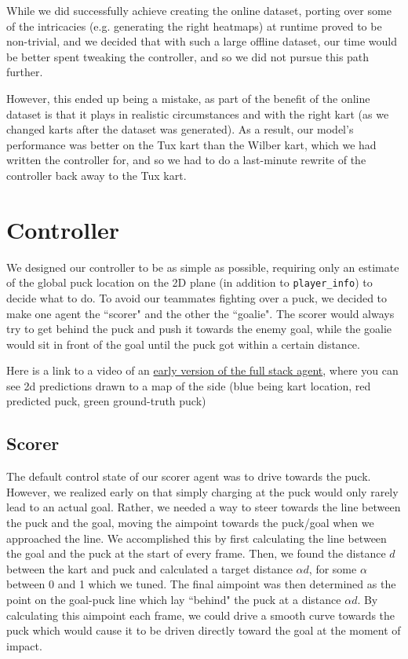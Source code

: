 \documentclass{article}
\begin{document}
While we did successfully achieve creating the online dataset, porting over some of the intricacies (e.g. generating the right heatmaps) at runtime proved to be non-trivial, and we decided that with such a large offline dataset, our time would be better spent tweaking the controller, and so we did not pursue this path further.

However, this ended up being a mistake, as part of the benefit of the online dataset is that it plays in realistic circumstances and with the right kart (as we changed karts after the dataset was generated). As a result, our model's performance was better on the Tux kart than the Wilber kart, which we had written the controller for, and so we had to do a last-minute rewrite of the controller back away to the Tux kart.

\section{Controller}
We designed our controller to be as simple as possible, requiring only an estimate of the global puck location on the 2D plane (in addition to \texttt{player\_info}) to decide what to do. To avoid our teammates fighting over a puck, we decided to make one agent the ``scorer" and the other the ``goalie". The scorer would always try to get behind the puck and push it towards the enemy goal, while the goalie would sit in front of the goal until the puck got within a certain distance.

Here is a link to a video of an \textcolor{blue}{\href{https://youtu.be/Y8gm358y8js}{early version of the full stack agent}}, where you can see 2d predictions drawn to a map of the side (blue being kart location, red predicted puck, green ground-truth puck)

\subsection{Scorer}
The default control state of our scorer agent was to drive towards the puck. However, we realized early on that simply charging at the puck would only rarely lead to an actual goal. Rather, we needed a way to steer towards the line between the puck and the goal, moving the aimpoint towards the puck/goal when we approached the line. We accomplished this by first calculating the line between the goal and the puck at the start of every frame. Then, we found the distance $d$ between the kart and puck and calculated a target distance $\alpha d$, for some $\alpha$ between 0 and 1 which we tuned. The final aimpoint was then determined as the point on the goal-puck line which lay ``behind" the puck at a distance $\alpha d$. By calculating this aimpoint each frame, we could drive a smooth curve towards the puck which would cause it to be driven directly toward the goal at the moment of impact.
\end{document}
